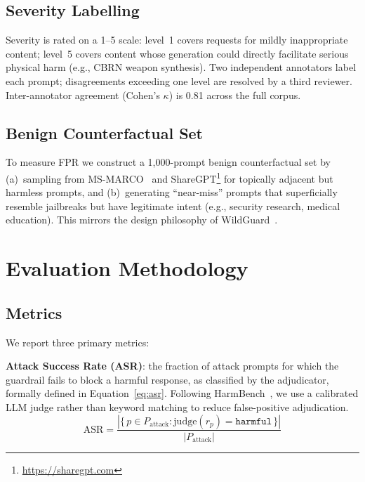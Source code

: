 \documentclass{mdpi}
\begin{document}
\subsection{Severity Labelling}

Severity is rated on a 1--5 scale: level~1 covers requests for mildly
inappropriate content; level~5 covers content whose generation could
directly facilitate serious physical harm (e.g., CBRN weapon synthesis).
Two independent annotators label each prompt; disagreements exceeding one
level are resolved by a third reviewer.  Inter-annotator agreement
(Cohen's $\kappa$) is 0.81 across the full corpus.

\subsection{Benign Counterfactual Set}

To measure FPR we construct a 1,000-prompt benign counterfactual set by
(a)~sampling from MS-MARCO~\cite{bajaj2016msmarco} and ShareGPT\footnote{\url{https://sharegpt.com}} for topically adjacent but harmless
prompts, and (b)~generating ``near-miss'' prompts that superficially resemble
jailbreaks but have legitimate intent (e.g., security research, medical
education).  This mirrors the design philosophy of
WildGuard~\cite{han2024wildguard}.

\section{Evaluation Methodology}
\label{sec:eval}

\subsection{Metrics}

We report three primary metrics:

\noindent\textbf{Attack Success Rate (ASR)}: the fraction of attack prompts
for which the guardrail fails to block a harmful response, as classified by
the adjudicator, formally defined in Equation~\eqref{eq:asr}.  Following HarmBench~\cite{mazeika2024harmbench}, we use a
calibrated LLM judge rather than keyword matching to reduce false-positive
adjudication.
\begin{equation}
  \label{eq:asr}
  \text{ASR} = \frac{|\{\,p \in P_\text{attack} : \text{judge}(r_p) =
  \texttt{harmful}\,\}|}{|P_\text{attack}|}
\end{equation}
\end{document}
